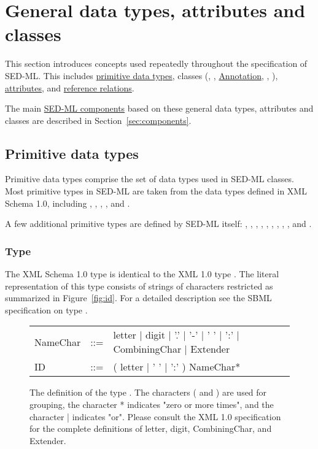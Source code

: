 \section{General data types, attributes and classes}
This section introduces concepts used repeatedly throughout the specification of SED-ML. This includes  \hyperref[sec:dataTypes]{primitive data types}, classes (\SedBase, \Notes, \hyperref[class:notes]{Annotation}, \Parameter, \Variable), \hyperref[sec:generalAttributes]{attributes}, and \hyperref[sec:reference]{reference relations}.

The main \hyperref[sec:components]{SED-ML components} based on these general data types, attributes and classes are described in Section~\ref{sec:components}.

\subsection{Primitive data types}
\label{sec:dataTypes}
Primitive data types comprise the set of data types used in SED-ML classes. Most primitive types in SED-ML are taken from the data types defined in XML Schema 1.0, including , , , ,  and . 

A few additional primitive types are defined by SED-ML itself: \hyperref[type:id]{}, \SId, \SIdRef, \hyperref[type:target]{}, \hyperref[type:xpath]{}, \hyperref[type:mathml]{}, \hyperref[type:anyURI]{}, \hyperref[type:urn]{}, \hyperref[type:numlsid]{}, and \hyperref[type:numlsidref]{}.

\subsubsection[\element{ID}]{Type }
\label{type:id}
The XML Schema 1.0 type  is identical to the XML 1.0 type . The literal representation of this type consists of strings of characters restricted as summarized in Figure~\vref{fig:id}. For a detailed description see the SBML specification on type  \citep{HBH+10}.

\begin{figure}[hbt]
  \ttfamily
  \small
  \centering
  \begin{tabular}{lll}
    NameChar & ::= & letter | digit | '.' | '-' | ' ' | ':' | CombiningChar | Extender\\
    ID    & ::= & ( letter | ' ' | ':' ) NameChar*\\
  \end{tabular}
  \vspace*{-1ex}
  \caption{The definition of the type . The characters ( and ) are used for grouping, the character * indicates "zero or more times", and the character | indicates "or". Please consult the XML 1.0 specification for the complete definitions of letter, digit, CombiningChar, and Extender.}
  \label{fig:id}
\end{figure}

